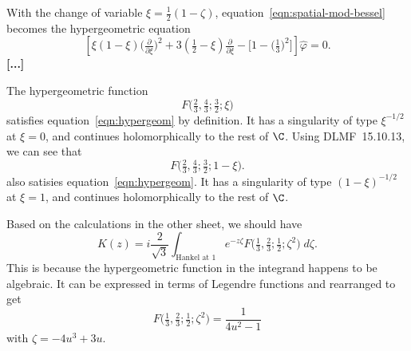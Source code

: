 \documentclass{article}
\theoremstyle{definition}
\theoremstyle{plain}
\begin{document}

With the change of variable $\xi = \tfrac{1}{2}(1-\zeta)$, equation~\ref{eqn:spatial-mod-bessel} becomes the hypergeometric equation
\begin{equation}\label{eqn:hypergeom}
\left[\xi(1 - \xi) \big(\tfrac{\partial}{\partial \xi}\big)^2 + 3(\tfrac{1}{2} - \xi) \tfrac{\partial}{\partial \xi} - \big[1 - \big(\tfrac{1}{3}\big)^2\big]\right] \hat{\varphi} = 0.
\end{equation}
\textbf{[...]}

The hypergeometric function
\[ F\big(\tfrac{2}{3}, \tfrac{4}{3}; \tfrac{3}{2}; \xi\big) \]
satisfies equation~\ref{eqn:hypergeom} by definition. It has a singularity of type $\xi^{-1/2}$ at $\xi = 0$, and continues holomorphically to the rest of $\C$. Using DLMF~15.10.13, we can see that
\[ F\big(\tfrac{2}{3}, \tfrac{4}{3}; \tfrac{3}{2}; 1-\xi\big). \]
also satisies equation~\ref{eqn:hypergeom}. It has a singularity of type $(1 - \xi)^{-1/2}$ at $\xi = 1$, and continues holomorphically to the rest of $\C$.

Based on the calculations in the other sheet, we should have
\[ K(z) = i \frac{2}{\sqrt{3}} \int_{\text{Hankel at } 1} e^{-z\zeta} F\big(\tfrac{1}{3}, \tfrac{2}{3}; \tfrac{1}{2}; \zeta^2\big)\;d\zeta. \]
This is because the hypergeometric function in the integrand happens to be algebraic. It can be expressed in terms of Legendre functions and rearranged to get
\[ F\big(\tfrac{1}{3}, \tfrac{2}{3}; \tfrac{1}{2}; \zeta^2\big) = \frac{1}{4u^2 - 1} \]
with $\zeta = -4u^3 + 3u$.
\end{document}
